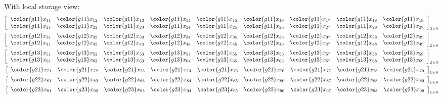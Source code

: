 With local storage view:
\begin{align*}
\left[\begin{array}{lllllllll}
      \color{g11}x_{11} & \color{g11}x_{12} & \color{g11}x_{13} & \color{g11}x_{14} & \color{g11}x_{15} & \color{g11}x_{16} & \color{g11}x_{17} & \color{g11}x_{18} & \color{g11}x_{19}\\
      \color{g11}x_{21} & \color{g11}x_{22} & \color{g11}x_{23} & \color{g11}x_{24} & \color{g11}x_{25} & \color{g11}x_{26} & \color{g11}x_{27} & \color{g11}x_{28} & \color{g11}x_{29}
\end{array}\right]_{2\times 9}
\\
\left[\begin{array}{lllllllll}
      \color{g12}x_{31} & \color{g12}x_{32} & \color{g12}x_{33} & \color{g12}x_{34} & \color{g12}x_{35} & \color{g12}x_{36} & \color{g12}x_{37} & \color{g12}x_{38} & \color{g12}x_{39}\\
      \color{g12}x_{41} & \color{g12}x_{42} & \color{g12}x_{43} & \color{g12}x_{44} & \color{g12}x_{45} & \color{g12}x_{46} & \color{g12}x_{47} & \color{g12}x_{48} & \color{g12}x_{49}
\end{array}\right]_{2\times 9}
\\
\left[\begin{array}{lllllllll}
      \color{g13}x_{51} & \color{g13}x_{52} & \color{g13}x_{53} & \color{g13}x_{54} & \color{g13}x_{55} & \color{g13}x_{56} & \color{g13}x_{57} & \color{g13}x_{58} & \color{g13}x_{59}\\
      \color{g13}x_{61} & \color{g13}x_{62} & \color{g13}x_{63} & \color{g13}x_{64} & \color{g13}x_{65} & \color{g13}x_{66} & \color{g13}x_{67} & \color{g13}x_{68} & \color{g13}x_{69}
\end{array}\right]_{2\times 9}
\\
\left[\begin{array}{lllllllll}
      \color{g21}x_{71} & \color{g21}x_{72} & \color{g21}x_{73} & \color{g21}x_{74} & \color{g21}x_{75} & \color{g21}x_{76} & \color{g21}x_{77} & \color{g21}x_{78} & \color{g21}x_{79}
\end{array}\right]_{1\times 9}
\\
\left[\begin{array}{lllllllll}
      \color{g22}x_{81} & \color{g22}x_{82} & \color{g22}x_{83} & \color{g22}x_{84} & \color{g22}x_{85} & \color{g22}x_{86} & \color{g22}x_{87} & \color{g22}x_{88} & \color{g22}x_{89}
\end{array}\right]_{1\times 9}
\\
\left[\begin{array}{lllllllll}
      \color{g23}x_{91} & \color{g23}x_{92} & \color{g23}x_{93} & \color{g23}x_{94} & \color{g23}x_{95} & \color{g23}x_{96} & \color{g23}x_{97} & \color{g23}x_{98} & \color{g23}x_{99}\\
\end{array}\right]_{1\times 9}
\end{align*}

